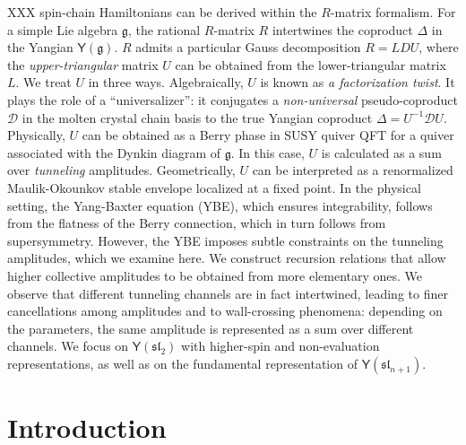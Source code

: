 \documentclass[10pt]{article}
\theoremstyle{definition}
\numberwithin{equation}{section}
\begin{document}
{\footnotesize
	XXX spin-chain Hamiltonians can be derived within the $R$-matrix formalism.
	For a simple Lie algebra $\mathfrak{g}$, the rational $R$-matrix $R$ intertwines the coproduct $\Delta$ in the Yangian $\mathsf{Y}(\mathfrak{g})$.
	$R$ admits a particular Gauss decomposition $R=LDU$, where the \textit{upper-triangular} matrix $U$ can be obtained from the lower-triangular matrix $L$.
	We treat $U$ in three ways.
	Algebraically, $U$ is known as \textit{a factorization twist}.
	It plays the role of a ``universalizer'': it conjugates a \textit{non-universal} pseudo-coproduct $\mathscr{D}$ in the molten crystal chain basis to the true Yangian coproduct $\Delta=U^{-1}\mathscr{D} U$.
	Physically, $U$ can be obtained as a Berry phase in SUSY quiver QFT for a quiver associated with the Dynkin diagram of $\mathfrak{g}$.
	In this case, $U$ is calculated as a sum over \textit{tunneling} amplitudes.
	Geometrically, $U$ can be interpreted as a renormalized Maulik-Okounkov stable envelope localized at a fixed point.
	In the physical setting, the Yang-Baxter equation (YBE), which ensures integrability, follows from the flatness of the Berry connection, which in turn follows from supersymmetry.
	However, the YBE imposes subtle constraints on the tunneling amplitudes, which we examine here.
	We construct recursion relations that allow higher collective amplitudes to be obtained from more elementary ones.
	We observe that different tunneling channels are in fact intertwined, leading to finer cancellations among amplitudes and to wall-crossing phenomena: depending on the parameters, the same amplitude is represented as a sum over different channels.
	We focus on $\mathsf{Y}(\mathfrak{sl}_2)$ with higher-spin and non-evaluation representations, as well as on the fundamental representation of $\mathsf{Y}(\mathfrak{sl}_{n+1})$.

}

\bigskip

\bigskip

\tableofcontents

\bigskip



\section{Introduction}
\end{document}
